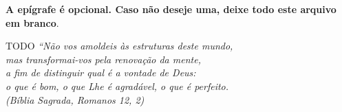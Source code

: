\begin{epigrafe}
    \vspace*{\fill}
	\begin{flushright}
		\textbf{A epígrafe é opcional. Caso não deseje uma, deixe todo
		este arquivo em branco}.

		TODO
		\textit{``Não vos amoldeis às estruturas deste mundo, \\
		mas transformai-vos pela renovação da mente, \\
		a fim de distinguir qual é a vontade de Deus: \\
		o que é bom, o que Lhe é agradável, o que é perfeito.\\
		(Bíblia Sagrada, Romanos 12, 2)}
	\end{flushright}
\end{epigrafe}
